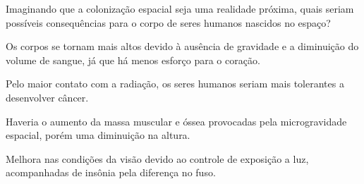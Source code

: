 Imaginando que a colonização espacial seja uma realidade próxima, quais seriam
possíveis consequências para o corpo de seres humanos nascidos no espaço?

\begin{escolha}
\item
  Os corpos se tornam mais altos devido à ausência de gravidade e a
  diminuição do volume de sangue, já que há menos esforço para o coração.
\item
  Pelo maior contato com a radiação, os seres humanos seriam mais
  tolerantes a desenvolver câncer.
\item
  Haveria o aumento da massa muscular e óssea provocadas pela
  microgravidade espacial, porém uma diminuição na altura.
\item
  Melhora nas condições da visão devido ao controle de exposição a luz,
  acompanhadas de insônia pela diferença no fuso.
\end{escolha}




